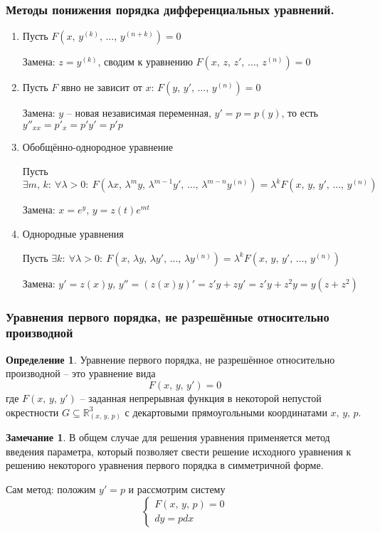 \documentclass[a4paper,12pt]{article}
\theoremstyle{plain}
\theoremstyle{definition}
\newtheorem{definition}{Определение}[section]
\newtheorem*{note}{Замечание}
\theoremstyle{remark}
\begin{document}
\subsubsection*{Методы понижения порядка дифференциальных уравнений.}
\begin{enumerate}
	\item Пусть $F(x,\, y^{(k)},\,\ldots,\,y^{(n + k)}) = 0$

	      Замена: $z = y^{(k)}$, сводим к уравнению $F(x,\, z,\, z',\,\ldots,\,z^{(n)}) = 0$
	\item Пусть $F$ явно не зависит от $x$: $F(y,\, y',\,\ldots,\,y^{(n)}) = 0$

	      Замена: $y$ -- новая независимая переменная, $y' = p = p(y)$, то есть $y''_{xx} = p'_x = p'y'=p'p$
	\item Обобщённо-однородное уравнение

	      Пусть $\exists m,\,k:\: \forall \lambda > 0:\: F(\lambda x,\, \lambda^m y,\, \lambda^{m - 1}y',\,\ldots,\,\lambda^{m - n}y^{(n)}) = \lambda^k F(x,\,y,\,y',\,\ldots,\,y^{(n)})$

	      Замена: $x = e^y,\, y = z(t)e^{mt}$
	\item Однородные уравнения

	      Пусть $\exists k:\: \forall \lambda > 0:\: F(x,\, \lambda y,\, \lambda y',\,\ldots,\, \lambda y^{(n)}) = \lambda^k F(x,\,y,\,y',\,\ldots,\,y^{(n)})$

	      Замена: $y' = z(x)y,\, y'' = (z(x)y)' = z'y + zy' = z'y + z^2y = y(z + z^2)$
\end{enumerate}

\subsubsection*{Уравнения первого порядка, не разрешённые относительно производной}
\begin{definition}
	Уравнение первого порядка, не разрешённое относительно производной -- это уравнение вида
	\[F(x,\,y,\,y') = 0\]
	где $F(x,\,y,\,y')$ -- заданная непрерывная функция в некоторой непустой окрестности $G \subseteq \mathbb{R}^3_{(x,\,y,\,p)}$ с декартовыми прямоугольными координатами $x,\,y,\,p$.
\end{definition}

\begin{note}
	В общем случае для решения уравнения применяется метод введения параметра, который позволяет свести решение исходного уравнения к решению некоторого уравнения первого порядка в симметричной форме.

	Сам метод: положим $y' = p$ и рассмотрим систему
	\begin{equation}
		\label{BASE}
		\begin{cases}
			F(x,\,y,\,p) = 0 \\
			dy = pdx
		\end{cases}
	\end{equation}
\end{note}
\end{document}

